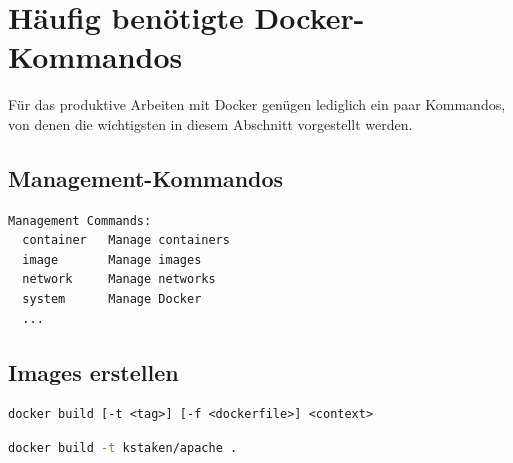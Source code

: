 \section{Häufig benötigte Docker-Kommandos}
\label{docker-kommandos}
Für das produktive Arbeiten mit Docker genügen lediglich ein paar Kommandos, von denen die wichtigsten in diesem Abschnitt vorgestellt werden.

\subsection{Management-Kommandos}
\begin{verbatim}
Management Commands:
  container   Manage containers
  image       Manage images
  network     Manage networks
  system      Manage Docker
  ...
\end{verbatim}

\subsection{Images erstellen}
\begin{verbatim}
docker build [-t <tag>] [-f <dockerfile>] <context>
\end{verbatim}
\begin{lstlisting}[caption=Docker-Build-Beispiel, language=bash, label=lst:docker-build-example]
docker build -t kstaken/apache .
\end{lstlisting}

